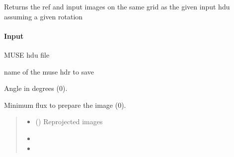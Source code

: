 \documentclass[letterpaper,10pt,english]{sphinxmanual}
\begin{document}
\begin{fulllineitems}
\begin{fulllineitems}
\label{\detokenize{api/pymusepipe:pymusepipe.align_pipe.AlignMuseDataset.get_imaref_muse}}
\pysigstartsignatures
{}
\pysigstopsignatures
\sphinxAtStartPar
Returns the ref and input images on the same grid as the given
input hdu assuming a given rotation


\paragraph{Input}
\label{\detokenize{api/pymusepipe:id6}}\begin{description}
\sphinxAtStartPar
MUSE hdu file

\sphinxAtStartPar
name of the muse hdr to save

\sphinxAtStartPar
Angle in degrees (0).

\sphinxAtStartPar
Minimum flux to prepare the image (0).

\end{description}
\begin{quote}\begin{description}
\begin{itemize}
\item {} 
\sphinxAtStartPar
{} () \textendash{} Reprojected images

\item {} 
\sphinxAtStartPar
{}

\item {} 
\sphinxAtStartPar
{}

\end{itemize}

\end{description}\end{quote}

\end{fulllineitems}



\end{fulllineitems}
\end{document}
